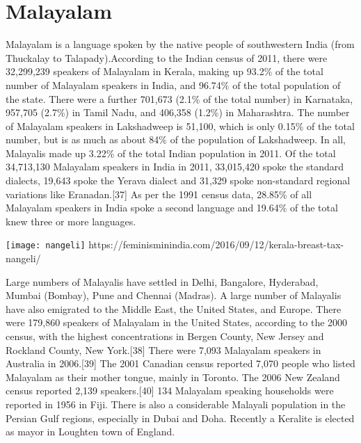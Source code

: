 \section{Malayalam}
\label{s:malayalam}
\newfontfamily{}

\def\malamtext#1{{\malayam#1}}


Malayalam is a language spoken by the native people of southwestern India (from Thuckalay to Talapady).According to the Indian census of 2011, there were 32,299,239 speakers of Malayalam in Kerala, making up 93.2\% of the total number of Malayalam speakers in India, and 96.74\% of the total population of the state. There were a further 701,673 (2.1\% of the total number) in Karnataka, 957,705 (2.7\%) in Tamil Nadu, and 406,358 (1.2\%) in Maharashtra. The number of Malayalam speakers in Lakshadweep is 51,100, which is only 0.15\% of the total number, but is as much as about 84\% of the population of Lakshadweep. In all, Malayalis made up 3.22\% of the total Indian population in 2011. Of the total 34,713,130 Malayalam speakers in India in 2011, 33,015,420 spoke the standard dialects, 19,643 spoke the Yerava dialect and 31,329 spoke non-standard regional variations like Eranadan.[37] As per the 1991 census data, 28.85\% of all Malayalam speakers in India spoke a second language and 19.64\% of the total knew three or more languages.


\texttt{[image: nangeli]}
https://feminisminindia.com/2016/09/12/kerala-breast-tax-nangeli/


Large numbers of Malayalis have settled in Delhi, Bangalore, Hyderabad, Mumbai (Bombay), Pune and Chennai (Madras). A large number of Malayalis have also emigrated to the Middle East, the United States, and Europe. There were 179,860 speakers of Malayalam in the United States, according to the 2000 census, with the highest concentrations in Bergen County, New Jersey and Rockland County, New York.[38] There were 7,093 Malayalam speakers in Australia in 2006.[39] The 2001 Canadian census reported 7,070 people who listed Malayalam as their mother tongue, mainly in Toronto. The 2006 New Zealand census reported 2,139 speakers.[40] 134 Malayalam speaking households were reported in 1956 in Fiji. There is also a considerable Malayali population in the Persian Gulf regions, especially in Dubai and Doha. Recently a Keralite is elected as mayor in Loughten town of England.

